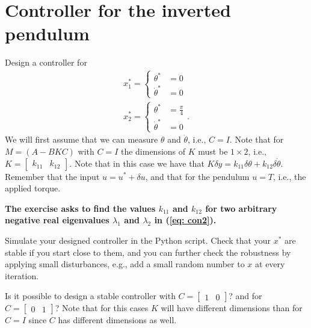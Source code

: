 \section{Controller for the inverted pendulum}
Design a controller for
\begin{align}
	x_1^* = \begin{cases}\theta^* &= 0 \\ \dot\theta^*&= 0 \end{cases} \nonumber \\
		x_2^* = \begin{cases}\theta^* &= \frac{\pi}{4} \\ \dot\theta^*&= 0 \end{cases}. \nonumber
\end{align}
We will first assume that we can measure $\theta$ and $\dot\theta$, i.e., $C = I$. Note that for $M = (A - BKC)$ with $C = I$ the dimensions of $K$ must be $1 \times 2$, i.e., $K = \begin{bmatrix}k_{11} & k_{12} \end{bmatrix}$. Note that in this case we have that $K\delta y = k_{11}\delta\theta + k_{12}\delta\dot\theta$. Remember that the input $u = u^* + \delta u$, and that for the pendulum $u = T$, i.e., the applied torque.

\textbf{The exercise asks to find the values $k_{11}$ and $k_{12}$ for two arbitrary negative real eigenvalues $\lambda_1$ and $\lambda_2$ in (\ref{eq: con2}).}

Simulate your designed controller in the Python script. Check that your $x^*$ are stable if you start close to them, and you can further check the robustness by applying small disturbances, e.g., add a small random number to $x$ at every iteration.

Is it possible to design a stable controller with $C = \begin{bmatrix}1 & 0\end{bmatrix}$? and for $C = \begin{bmatrix}0 & 1\end{bmatrix}$? Note that for this cases $K$ will have different dimensions than for $C = I$ since $C$ has different dimensions as well.
